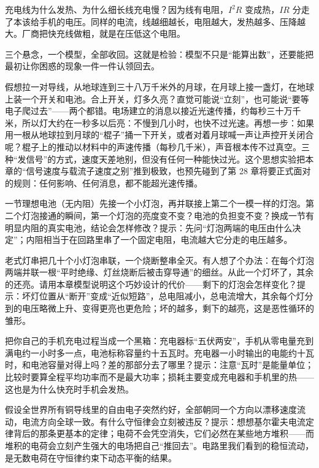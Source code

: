 充电线为什么发热、为什么细长线充电慢？因为线有电阻，\(I^{2}R\) 变成热，\(IR\) 分走了本该给手机的电压。同样的电流，线越细越长，电阻越大，发热越多、压降越大。厂商把快充线做粗，就是在压低这个电阻。

三个悬念，一个模型，全部收回。这就是检验：模型不只是“能算出数”，还要能把最初让你困惑的现象一件一件认领回去。


\begin{thought}[从地球到月球的电路]
假想拉一对导线，从地球连到三十八万千米外的月球，在月球上接一盏灯，在地球上装一个开关和电池。合上开关，灯多久亮？直觉可能说“立刻”，也可能说“要等电子爬过去”——两个都错。电场建立的消息以接近光速传播，约每秒三十万千米，所以灯大约在一秒多以后亮：不慢到几小时，也快不过光速。再想一步：如果用一根从地球拉到月球的“棍子”捅一下开关，或者对着月球喊一声让声控开关闭合呢？棍子上的推动以材料中的声速传播（每秒几千米），声音根本传不过真空。三种“发信号”的方式，速度天差地别，但没有任何一种能快过光。这个思想实验把本章的“信号速度与载流子速度之别”推到极致，也预先碰到了第 28 章将要正式面对的规则：任何影响、任何消息，都不能超光速传播。
\end{thought}

\begin{puzzles}
\item 一节理想电池（无内阻）先接一个小灯泡，再并联接上第二个一模一样的灯泡。第二个灯泡接通的瞬间，第一个灯泡的亮度变不变？电池的负担变不变？换成一节有明显内阻的真实电池，结论会怎样修改？提示：先问“灯泡两端的电压由什么决定”；内阻相当于在回路里串了一个固定电阻，电流越大它分走的电压越多。
\item 老式灯串把几十个小灯泡串联，一个烧断整串全灭。有人想了个办法：在每个灯泡两端并联一根“平时绝缘、灯丝烧断后被击穿导通”的细丝。从此一个灯坏了，其余的还亮。请用本章模型说明这个巧妙设计的代价——剩下的灯泡会怎样变化？提示：坏灯位置从“断开”变成“近似短路”，总电阻减小，总电流增大，其余每个灯分到的电压略微上升、变得更亮也更危险；坏的越多，剩下的越亮，这是恶性循环的雏形。
\item 把你自己的手机充电过程当成一个黑箱：充电器标“五伏两安”，手机从零电量充到满电约一小时多一点，电池标称容量约十五瓦时。充电器一小时输出的电能约十瓦时，和电池容量对得上吗？差的那部分去了哪里？提示：注意“瓦时”是能量单位；比较时要算全程平均功率而不是最大功率；损耗主要变成充电器和手机里的热——这也是为什么快充时手机会发热。
\item 假设全世界所有铜导线里的自由电子突然约好，全部朝同一个方向以漂移速度流动，电流方向全球一致。有什么守恒律会立刻被违反？提示：想想基尔霍夫电流定律背后的那条更基本的定律；电荷不会凭空消失，它们必然在某些地方堆积——而堆积的电荷会立刻产生强大的电场把自己“推回去”。电路里我们看到的稳恒流动，是无数电荷在守恒律约束下动态平衡的结果。
\end{puzzles}
